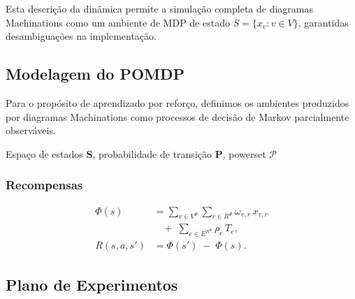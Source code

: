 \documentclass[10pt,a4paper]{article}
\newcommand{\St}{\mathbf{S}}
\newcommand{\Ptr}{\mathbf{P}}
\begin{document}
Esta descrição da dinâmica permite a simulação completa de diagramas Machinations como um ambiente de MDP de estado $S = \{x_v : v \in V\}$, garantidas desambiguações na implementação.

\subsection{Modelagem do POMDP}
\label{m:mdp}

Para o propósito de aprendizado por reforço, definimos os ambientes produzidos por diagramas Machinations como processos de decisão de Markov parcialmente observáveis. 

Espaço de estados $\St$, probabilidade de transição $\Ptr$, powerset $\mathcal{P}$

\subsubsection{Recompensas}
\label{m:mdp:recompensas}
\begin{align*}
    \Phi(s) &= \sum_{v\in V^{\Phi}}\sum_{r \in R^{\Phi}}\omega_{v,r}\,x_{v,r}\\
          &\ \ \ \ +\;\sum_{e\in E^{R^{\Phi}}}\rho_{e}\,T_{e},\\
R(s,a,s') &= \Phi(s') \;-\; \Phi(s).
\end{align*}

\subsection{Plano de Experimentos}
\label{m:experiments}

\printbibliography
\end{document}
